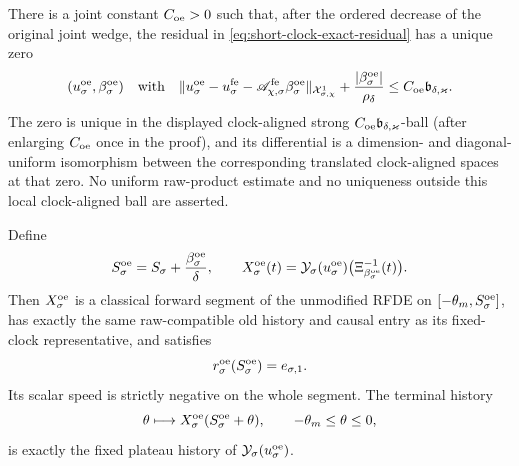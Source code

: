 \begin{theorem}
There is a joint constant \(C_{\rm oe}>0\) such that, after the ordered
decrease of the original joint wedge, the residual in
\cref{eq:short-clock-exact-residual} has a unique zero
\begin{equation}
 (u_\sigma^{\rm oe},\beta_\sigma^{\rm oe})
 \quad\hbox{with}\quad
 \|u_\sigma^{\rm oe}-u_\sigma^{\rm fe}
       -\mathscr A_{\chi,\sigma}^{\rm fe}
          \beta_\sigma^{\rm oe}\|_
       {\mathcal X_{\sigma,\chi}^1}
 +\frac{|\beta_\sigma^{\rm oe}|}{\rho_\delta}
 \le C_{\rm oe}\mathfrak b_{\delta,\varkappa}.  \label{eq:short-clock-zero-bound}
\end{equation}
The zero is unique in the displayed clock-aligned strong
\(C_{\rm oe}\mathfrak b_{\delta,\varkappa}\)-ball (after enlarging
\(C_{\rm oe}\) once in the proof), and its differential is a dimension-
and diagonal-uniform isomorphism between the corresponding translated
clock-aligned spaces at that zero.  No uniform raw-product estimate and no
uniqueness outside this local clock-aligned ball are asserted.

Define
\begin{equation}
 S_\sigma^{\rm oe}
 =S_\sigma+\frac{\beta_\sigma^{\rm oe}}{\delta},
 \qquad
 X_\sigma^{\rm oe}(t)
 =\mathcal Y_\sigma(u_\sigma^{\rm oe})
       \bigl(\Xi_{\beta_\sigma^{\rm oe}}^{-1}(t)\bigr).
                                                        \label{eq:short-clock-physical-segment}
\end{equation}
Then \(X_\sigma^{\rm oe}\) is a classical forward segment of the
unmodified RFDE on
\([-\theta_m,S_\sigma^{\rm oe}]\), has exactly the same raw-compatible
old history and causal entry as its fixed-clock representative, and
satisfies
\begin{equation}
 r_\sigma^{\rm oe}(S_\sigma^{\rm oe})=e_{\sigma,1}.
                                                        \label{eq:short-clock-original-endpoint}
\end{equation}
Its scalar speed is strictly negative on the whole segment.  The terminal
history
\[
 \theta\longmapsto
 X_\sigma^{\rm oe}(S_\sigma^{\rm oe}+\theta),
 \qquad-\theta_m\le\theta\le0,
\]
is exactly the fixed plateau history of
\(\mathcal Y_\sigma(u_\sigma^{\rm oe})\).


\end{theorem}
